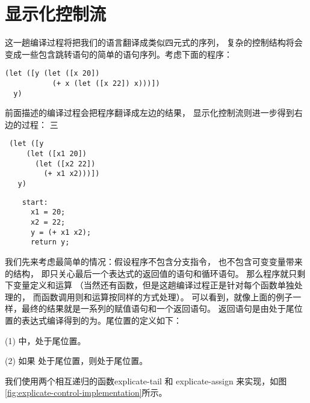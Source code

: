 
\section{显示化控制流}
\label{sec:control}

这一趟编译过程将把我们的语言翻译成类似四元式的序列，
复杂的控制结构将会变成一些包含跳转语句的简单的语句序列。考虑下面的程序：

\begin{multilinecode}
\begin{lstlisting}
(let ([y (let ([x 20])
           (+ x (let ([x 22]) x)))])
  y)
\end{lstlisting}
\end{multilinecode}

前面描述的编译过程会把程序翻译成左边的结果，
显示化控制流则进一步得到右边的过程：
三
\begin{transformation}
\begin{lstlisting}
 (let ([y
     (let ([x1 20])
       (let ([x2 22])
         (+ x1 x2)))])
   y)
\end{lstlisting}
\compilesto
\begin{lstlisting}
    start:
      x1 = 20;
      x2 = 22;
      y = (+ x1 x2);
      return y;
\end{lstlisting}
\end{transformation}

我们先来考虑最简单的情况：假设程序不包含分支指令，
也不包含可变变量带来的结构，
即只关心最后一个表达式的返回值的语句和循环语句。
那么程序就只剩下变量定义和运算
（当然还有函数，但是这趟编译过程正是针对每个函数单独处理的，
而函数调用则和运算按同样的方式处理）。
可以看到，就像上面的例子一样，最终的结果就是一系列的赋值语句和一个返回语句。
返回语句是由处于尾位置的表达式编译得到的为。尾位置的定义如下：

(1) 中，处于尾位置。

(2) 如果  处于尾位置，则处于尾位置。



我们使用两个相互递归的函数explicate-tail 和 explicate-assign 来实现，如图\ref{fig:explicate-control-implementation}所示。

